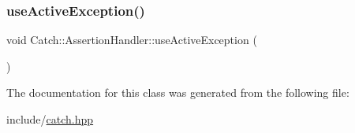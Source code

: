 \mbox{\label{classCatch_1_1AssertionHandler_ae5c135c28109bf82efeefeb00c0ddb22}} 
\subsubsection{\texorpdfstring{use\+Active\+Exception()}{useActiveException()}}
{\footnotesize\ttfamily void Catch\+::\+Assertion\+Handler\+::use\+Active\+Exception (\begin{DoxyParamCaption}{ }\end{DoxyParamCaption})}



The documentation for this class was generated from the following file\+:\begin{DoxyCompactItemize}
\item 
include/\mbox{\hyperlink{catch_8hpp}{catch.\+hpp}}\end{DoxyCompactItemize}
